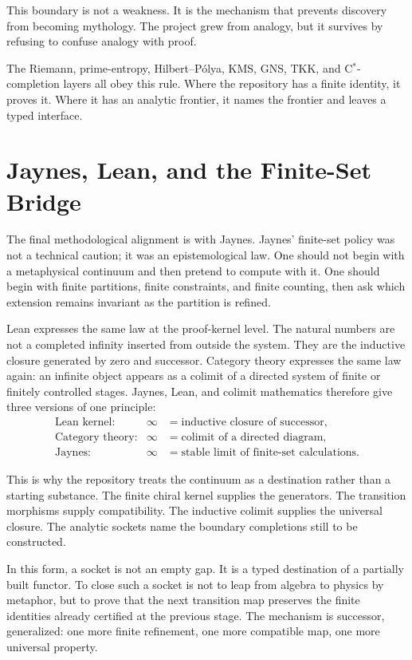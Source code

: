 This boundary is not a weakness.  It is the mechanism that prevents discovery
from becoming mythology.  The project grew from analogy, but it survives by
refusing to confuse analogy with proof.

The Riemann, prime-entropy, Hilbert--P\'olya, KMS, GNS, TKK, and
C$^\ast$-completion layers all obey this rule.  Where the repository has a
finite identity, it proves it.  Where it has an analytic frontier, it names the
frontier and leaves a typed interface.

\section{Jaynes, Lean, and the Finite-Set Bridge}

The final methodological alignment is with Jaynes.  Jaynes' finite-set policy
was not a technical caution; it was an epistemological law.  One should not
begin with a metaphysical continuum and then pretend to compute with it.  One
should begin with finite partitions, finite constraints, and finite counting,
then ask which extension remains invariant as the partition is refined.

Lean expresses the same law at the proof-kernel level.  The natural numbers are
not a completed infinity inserted from outside the system.  They are the
inductive closure generated by zero and successor.  Category theory expresses
the same law again: an infinite object appears as a colimit of a directed system
of finite or finitely controlled stages.  Jaynes, Lean, and colimit mathematics
therefore give three versions of one principle:
\[
\begin{array}{lll}
\text{Lean kernel:} & \infty & = \text{inductive closure of successor},\\
\text{Category theory:} & \infty & = \text{colimit of a directed diagram},\\
\text{Jaynes:} & \infty & = \text{stable limit of finite-set calculations}.
\end{array}
\]

This is why the repository treats the continuum as a destination rather than a
starting substance.  The finite chiral kernel supplies the generators.  The
transition morphisms supply compatibility.  The inductive colimit supplies the
universal closure.  The analytic sockets name the boundary completions still to
be constructed.

In this form, a socket is not an empty gap.  It is a typed destination of a
partially built functor.  To close such a socket is not to leap from algebra to
physics by metaphor, but to prove that the next transition map preserves the
finite identities already certified at the previous stage.  The mechanism is
successor, generalized: one more finite refinement, one more compatible map,
one more universal property.

